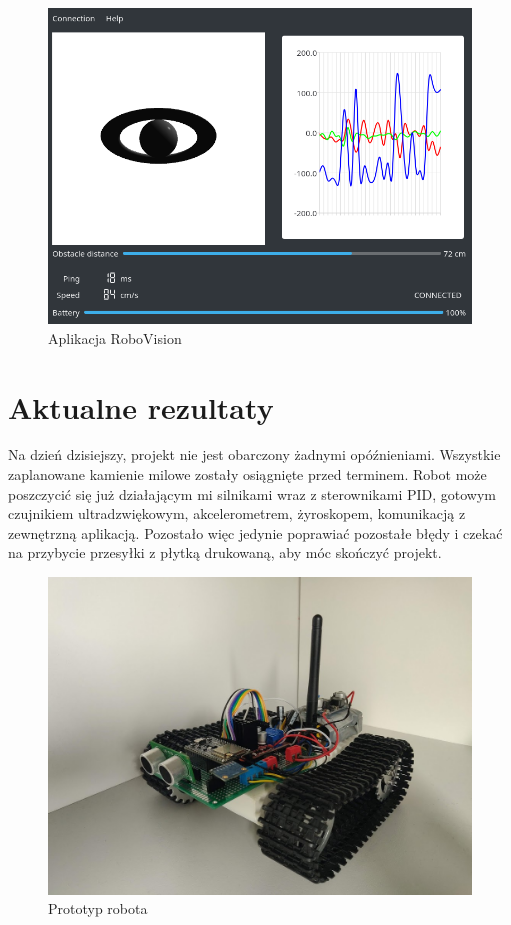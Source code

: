 \documentclass[10pt, a4paper]{article}
\begin{document}
\begin{figure}[H]
	\centering
	\includegraphics[width=1\textwidth]{figures/app.png}
	\caption{Aplikacja RoboVision}
	\label{fig:app}
\end{figure}


\section{Aktualne rezultaty}
Na dzień dzisiejszy, projekt nie jest obarczony żadnymi opóźnieniami. Wszystkie 
zaplanowane kamienie milowe zostały osiągnięte przed terminem. Robot może 
poszczycić się już działającym mi silnikami wraz z sterownikami PID, gotowym
czujnikiem ultradzwiękowym, akcelerometrem, żyroskopem, komunikacją z 
zewnętrzną aplikacją. Pozostało więc jedynie poprawiać pozostałe błędy i 
czekać na przybycie przesyłki z płytką drukowaną, aby móc skończyć projekt. 

\begin{figure}[H]
	\centering
	\includegraphics[width=1\textwidth]{figures/robotv1.jpg}
	\caption{Prototyp robota}
	\label{fig:robot}
\end{figure}
\end{document}
